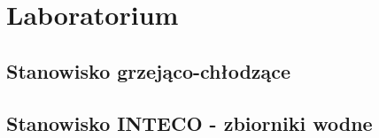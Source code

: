 \documentclass[a4paper,titlepage,11pt,twosides,floatssmall]{mwrep}
\begin{document}
\chapter{Laboratorium}

\section{Stanowisko grzejąco-chłodzące}







\section{Stanowisko INTECO - zbiorniki wodne}








\end{document}
